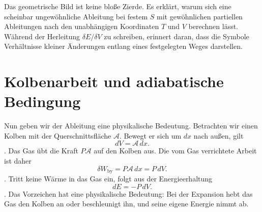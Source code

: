 Das geometrische Bild ist keine bloße Zierde. Es erklärt, warum sich eine scheinbar ungewöhnliche Ableitung bei festem \(S\) mit gewöhnlichen partiellen Ableitungen nach den unabhängigen Koordinaten \(T\) und \(V\) berechnen lässt. Während der Herleitung \(\delta E/\delta V\) zu schreiben, erinnert daran, dass die Symbole Verhältnisse kleiner Änderungen entlang eines festgelegten Weges darstellen.

\begin{classroomqa}\end{classroomqa}

\begin{classroomqa}\end{classroomqa}

\section{Kolbenarbeit und adiabatische Bedingung}

Nun geben wir der Ableitung eine physikalische Bedeutung. Betrachten wir einen Kolben mit der Querschnittsfläche \(\mathcal A\). Bewegt er sich um \(dx\) nach außen, gilt \begin{equation}
 dV=\mathcal A\,dx.
 \label{eq:sm5-piston-volume}
\end{equation}. Das Gas übt die Kraft \(P\mathcal A\) auf den Kolben aus. Die vom Gas verrichtete Arbeit ist daher \begin{equation}
 \delta W_{\mathrm{by}}=P\mathcal A\,dx=P\,dV.
 \label{eq:sm5-piston-work}
\end{equation}. Tritt keine Wärme in das Gas ein, folgt aus der Energieerhaltung \begin{equation}
 dE=-P\,dV.
 \label{eq:sm5-adiabatic-work}
\end{equation}. Das Vorzeichen hat eine physikalische Bedeutung: Bei der Expansion hebt das Gas den Kolben an oder beschleunigt ihn, und seine eigene Energie nimmt ab.

